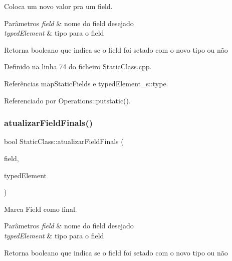 Coloca um novo valor pra um field. 


\begin{DoxyParams}{Parâmetros}
{\em field} & nome do field desejado \\
\hline
{\em typed\+Element} & tipo para o field \\
\hline
\end{DoxyParams}
\begin{DoxyReturn}{Retorna}
booleano que indica se o field foi setado com o novo tipo ou não 
\end{DoxyReturn}


Definido na linha 74 do ficheiro Static\+Class.\+cpp.



Referências map\+Static\+Fields e typed\+Element\+\_\+s\+::type.



Referenciado por Operations\+::putstatic().

\mbox{\label{classStaticClass_a4e5d8d70d10266989b2821e10bd8dacc}} 
\subsubsection{\texorpdfstring{atualizar\+Field\+Finals()}{atualizarFieldFinals()}}
{\footnotesize\ttfamily bool Static\+Class\+::atualizar\+Field\+Finals (\begin{DoxyParamCaption}\item[{string}]{field,  }\item[{\hyperlink{BasicTypes_8h_a97b332303b1262282599e6ede0637b82}{Typed\+Element}}]{typed\+Element }\end{DoxyParamCaption})}



Marca Field como final. 


\begin{DoxyParams}{Parâmetros}
{\em field} & nome do field desejado \\
\hline
{\em typed\+Element} & tipo para o field \\
\hline
\end{DoxyParams}
\begin{DoxyReturn}{Retorna}
booleano que indica se o field foi setado com o novo tipo ou não 
\end{DoxyReturn}


